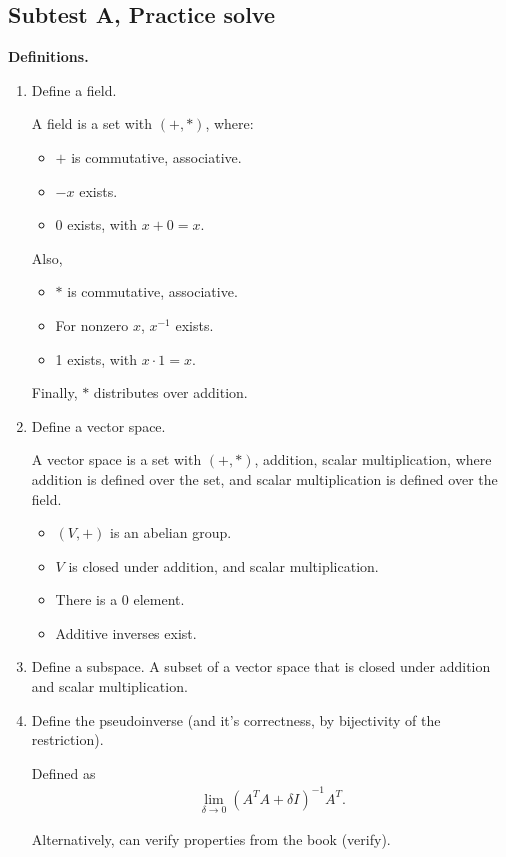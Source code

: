 \documentclass{article}
\begin{document}
\subsection{Subtest A, Practice solve}

{\bf Definitions.}

\begin{enumerate}
  \item Define a field.

    A field is a set with $(+, *)$, where:

    \begin{itemize}
      \item $+$ is commutative, associative.
      \item $-x$ exists.
      \item $0$ exists, with $x+0 = x$.
    \end{itemize}
    Also, 
    \begin{itemize}
      \item $*$ is commutative, associative.
      \item For nonzero $x$, $x^{-1}$ exists.
      \item 1 exists, with $x \cdot 1 = x$.
    \end{itemize}

    Finally, $*$ distributes over addition.

  \item Define a vector space.

    A vector space is a set with $(+, *)$, addition, scalar multiplication, where addition is defined over the set, and scalar multiplication is defined over the field.

    \begin{itemize}
      \item $(V, +)$ is an abelian group.
      \item $V$ is closed under addition, and scalar multiplication.
      \item There is a 0 element.
      \item Additive inverses exist.
    \end{itemize}

  \item Define a subspace. A subset of a vector space that is closed under addition and scalar multiplication.

  \item Define the pseudoinverse (and it's correctness, by bijectivity of the restriction).

    Defined as
    \begin{align*}
      \lim_{\delta \to 0} (A^T A + \delta I)^{-1} A^T.
    \end{align*}

    Alternatively, can verify properties from the book (verify).
\end{enumerate}
\end{document}
